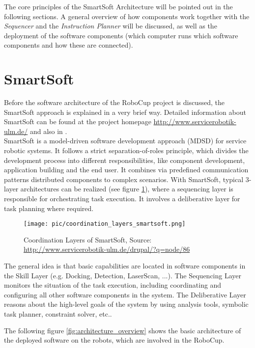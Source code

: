 The core principles of the SmartSoft Architecture will be pointed out in the following
sections. A general overview of how components work together with the \textit{Sequencer} and the \textit{Instruction Planner} will be discussed,
as well as the deployment of the software components (which computer runs which software components and how these are connected).

\section{SmartSoft}
Before the software architecture of the RoboCup project is discussed, the SmartSoft approach is explained in a very brief way. Detailed information about SmartSoft can be found at the project homepage \url{http://www.servicerobotik-ulm.de/} and also in \cite{JOSER}.\\
SmartSoft is a model-driven software development approach (MDSD) for service robotic systems. It follows a strict separation-of-roles principle, which divides the development process into different responsibilities, like component development, application building and the end user. It combines via predefined communication patterns distributed components to complex scenarios.
With SmartSoft, typical 3-layer architectures can be realized (see figure \ref{fig:architecture_smartsoft_layers}), where a sequencing layer is responsible for orchestrating task execution. It involves a deliberative layer for task planning where required.

\begin{figure}[h]
\centering
\texttt{[image: pic/coordination\_layers\_smartsoft.png]}
\caption{Coordination Layers of SmartSoft, Source: \protect\url{http://www.servicerobotik-ulm.de/drupal/?q=node/86}}
\label{fig:architecture_smartsoft_layers}
\end{figure}

The general idea is that basic capabilities are located in software components in the Skill Layer (e.g. Docking, Detection, LaserScan, ...). The Sequencing Layer monitors the situation of the task execution, including coordinating and configuring all other software components in the system. The Deliberative Layer reasons about the high-level goals of the system by using analysis tools, symbolic task planner, constraint solver, etc..

The following figure \ref{fig:architecture_overview} shows the basic architecture of the deployed software on the robots, which are involved in the RoboCup. \\

